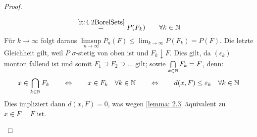 \begin{proof}
\begin{description}
\begin{equation*}
			\overset{\ref{it:4.2BorelSets}}{=}
			P(F_k) \qquad \forall k \in \mathbb{N}
		\end{equation*}
		Für $k \to \infty$ folgt daraus $\limsup\limits_{n \to \infty} P_n(F) \le \lim_{k \to \infty} P(F_k) = P(F)$.
		Die letzte Gleichheit gilt, weil $P$ $\sigma$-stetig von oben ist und $F_k \downarrow F$. Dies gilt, da $(\epsilon_k)$ monton fallend ist und somit $F_1 \supseteq F_2 \supseteq \dots$ gilt; sowie $\bigcap\limits_{k \in\mathbb{N}} F_k = F$, denn:
		\begin{equation*}
			x \in\bigcap_{k \in\mathbb{N}} F_k
			\qquad \Leftrightarrow \qquad
			x \in F_k \quad \forall k \in \mathbb{N} 
			\qquad \Leftrightarrow \qquad 
			d(x,F) \le \varepsilon_k \quad \forall k \in \mathbb{N} 
		\end{equation*}
		Dies impliziert dann $d(x,F) = 0$, was wegen \cref{lemma: 2.3} äquivalent zu $x \in \overline{F} = F$ ist.
	\end{description}
\end{proof}